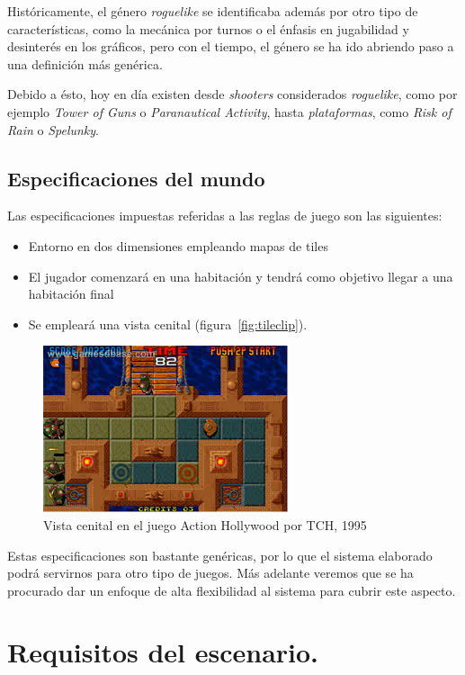 Históricamente, el género \emph{roguelike} se identificaba además por otro tipo de características, como la mecánica por turnos o el énfasis en jugabilidad y desinterés en los gráficos, pero con el tiempo, el género se ha ido abriendo paso a una definición más genérica.

Debido a ésto, hoy en día existen desde \emph{shooters} considerados \emph{roguelike}, como por ejemplo \emph{Tower of Guns} o \emph{Paranautical Activity}, hasta \emph{plataformas}, como \emph{Risk of Rain} o \emph{Spelunky}.

\subsection{Especificaciones del mundo}

Las especificaciones impuestas referidas a las reglas de juego son las siguientes:

\begin{itemize}
	\item Entorno en dos dimensiones empleando mapas de tiles
	\item El jugador comenzará en una habitación y tendrá como objetivo llegar a una habitación final
	\item Se empleará una vista cenital (figura~\ref{fig:tileclip}).
\end{itemize}

\begin{figure}[t]
\centering
\includegraphics[scale=1]{img/cenital}
\caption{Vista cenital en el juego Action Hollywood por TCH, 1995
\label{fig:cenital}}
\end{figure}

Estas especificaciones son bastante genéricas, por lo que el sistema elaborado podrá servirnos para otro tipo de juegos. Más adelante veremos que se ha procurado dar un enfoque de alta flexibilidad al sistema para cubrir este aspecto.

\section{Requisitos del escenario.}

